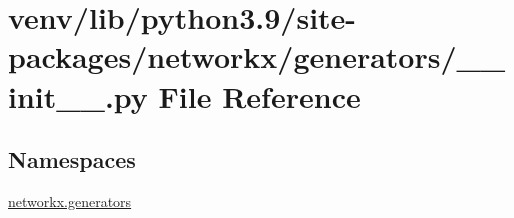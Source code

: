 \hypertarget{venv_2lib_2python3_89_2site-packages_2networkx_2generators_2____init_____8py}{}\section{venv/lib/python3.9/site-\/packages/networkx/generators/\+\_\+\+\_\+init\+\_\+\+\_\+.py File Reference}
\label{venv_2lib_2python3_89_2site-packages_2networkx_2generators_2____init_____8py}
\subsection*{Namespaces}
\begin{DoxyCompactItemize}
\item 
 \hyperlink{namespacenetworkx_1_1generators}{networkx.\+generators}
\end{DoxyCompactItemize}
